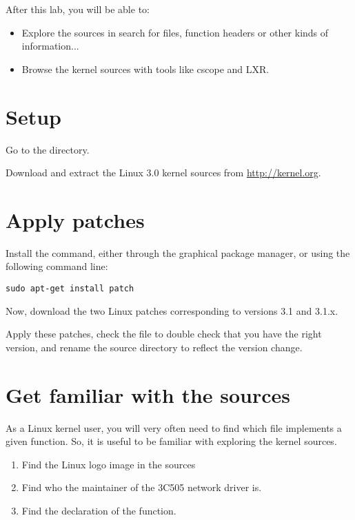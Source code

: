 
After this lab, you will be able to:

\begin{itemize}

\item Explore the sources in search for files, function headers or
  other kinds of information...

\item Browse the kernel sources with tools like cscope and LXR.

\end{itemize}

\section{Setup}

Go to the  directory.

Download and extract the Linux 3.0 kernel sources
from \url{http://kernel.org}.

\section{Apply patches}

Install the  command, either through the graphical package
manager, or using the following command line:

\begin{verbatim}
sudo apt-get install patch
\end{verbatim}

Now, download the two Linux patches corresponding to versions 3.1 and 3.1.x.

Apply these patches, check the  file to double check
that you have the right version, and rename the source directory to
reflect the version change.

\section{Get familiar with the sources}

As a Linux kernel user, you will very often need to find which file
implements a given function. So, it is useful to be familiar with
exploring the kernel sources.

\begin{enumerate}
\item Find the Linux logo image in the sources
\item Find who the maintainer of the 3C505 network driver is.
\item Find the declaration of the  function.
\end{enumerate}

